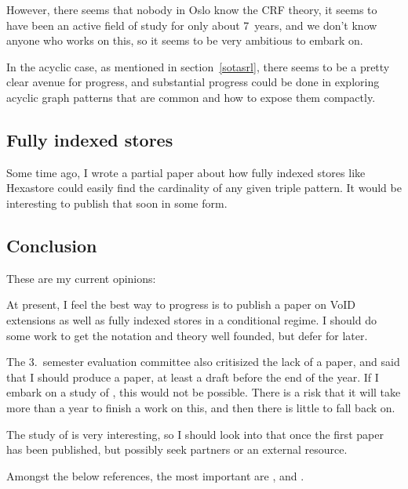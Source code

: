 However, there seems that nobody in Oslo know the CRF theory, it seems
to have been an active field of study for only about 7~years, and we don't
know anyone who works on this, so it seems to be very ambitious to
embark on. 

In the acyclic case, as mentioned in section~\ref{sotasrl}, there
seems to be a pretty clear avenue for progress, and substantial
progress could be done in exploring acyclic graph patterns that are
common and how to expose them compactly.


\subsection{Fully indexed stores}

Some time ago, I wrote a partial paper about how fully indexed stores
like Hexastore \cite{Weiss:2008:HSI:1453856.1453965} could easily find the cardinality of
any given triple pattern. It would be interesting to publish that soon
in some form.

\subsection{Conclusion}

These are my current opinions: 

At present, I feel the best way to progress is to publish a paper on
VoID extensions as well as fully indexed stores in a conditional
regime. I should do some work to get the notation and theory well
founded, but defer \SRL{} for later.

The 3.~semester evaluation committee also critisized the lack of a
paper, and said that I should produce a paper, at least a draft before
the end of the year. If I embark on a study of \SRL{}, this would not
be possible. There is a risk that it will take more than a year to finish
a work on this, and then there is little to fall back on.

The study of \SRL{} is very interesting, so I should look into that
once the first paper has been published, but possibly seek partners or
an external resource. 

Amongst the below references, the most important are
\cite{selectivityPRM}, \cite{splendid} and \cite{Lin:2011:LRB:2063016.2063042}.
